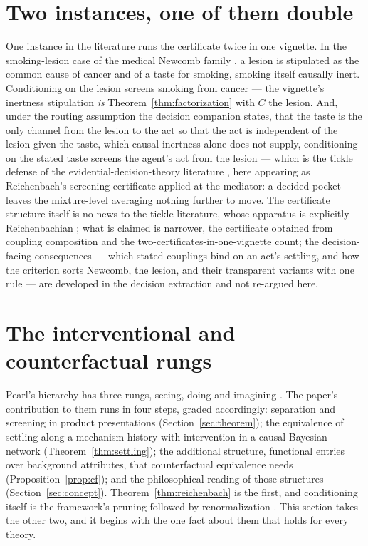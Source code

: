 \documentclass[11pt]{article}
\begin{document}
\section{Two instances, one of them double}
\label{sec:instances}

One instance in the literature runs the certificate twice in one vignette. In the smoking-lesion case of the medical Newcomb family \cite{skyrms1980causal, nozick1969newcomb}, a lesion is stipulated as the common cause of cancer and of a taste for smoking, smoking itself causally inert. Conditioning on the lesion screens smoking from cancer --- the vignette's inertness stipulation \emph{is} Theorem~\ref{thm:factorization} with $C$ the lesion. And, under the routing assumption the decision companion states, that the taste is the only channel from the lesion to the act so that the act is independent of the lesion given the taste, which causal inertness alone does not supply, conditioning on the stated taste screens the agent's act from the lesion --- which is the tickle defense of the evidential-decision-theory literature \cite{eells1982rational}, here appearing as Reichenbach's screening certificate applied at the mediator: a decided pocket leaves the mixture-level averaging nothing further to move. The certificate structure itself is no news to the tickle literature, whose apparatus is explicitly Reichenbachian \cite{eells1982rational}; what is claimed is narrower, the certificate obtained from coupling composition and the two-certificates-in-one-vignette count; the decision-facing consequences --- which stated couplings bind on an act's settling, and how the criterion sorts Newcomb, the lesion, and their transparent variants with one rule --- are developed in the decision extraction \cite{AethusDecision} and not re-argued here.

\section{The interventional and counterfactual rungs}
\label{sec:rungs}

Pearl's hierarchy has three rungs, seeing, doing and imagining \cite{pearl2009causality}. The paper's contribution to them runs in four steps, graded accordingly: separation and screening in product presentations (Section~\ref{sec:theorem}); the equivalence of settling along a mechanism history with intervention in a causal Bayesian network (Theorem~\ref{thm:settling}); the additional structure, functional entries over background attributes, that counterfactual equivalence needs (Proposition~\ref{prop:cf}); and the philosophical reading of those structures (Section~\ref{sec:concept}). Theorem~\ref{thm:reichenbach} is the first, and conditioning itself is the framework's pruning followed by renormalization \cite{Aethus}. This section takes the other two, and it begins with the one fact about them that holds for every theory.
\end{document}
